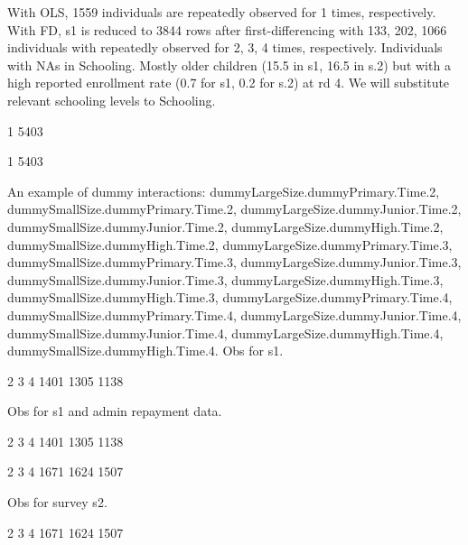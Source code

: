 With OLS,  1559 individuals are repeatedly observed for 1 times, respectively. With FD, \textsf{s1} is reduced to 3844 rows after first-differencing with 133, 202, 1066 individuals with repeatedly observed for 2, 3, 4 times, respectively.
Individuals with NAs in \textsf{Schooling}. Mostly older children (15.5 in \textsf{s1}, 16.5 in \textsf{s.2}) but with a high reported enrollment rate (0.7 for \textsf{s1}, 0.2 for \textsf{s.2}) at rd 4. We will substitute relevant schooling levels to \textsf{Schooling}.
\begin{Schunk}
\begin{Soutput}

   1 
5403 
\end{Soutput}
\begin{Soutput}

   1 
5403 
\end{Soutput}
\end{Schunk}
An example of dummy interactions: \textsf{\footnotesize dummyLargeSize.dummyPrimary.Time.2, dummySmallSize.dummyPrimary.Time.2, dummyLargeSize.dummyJunior.Time.2, dummySmallSize.dummyJunior.Time.2, dummyLargeSize.dummyHigh.Time.2, dummySmallSize.dummyHigh.Time.2, dummyLargeSize.dummyPrimary.Time.3, dummySmallSize.dummyPrimary.Time.3, dummyLargeSize.dummyJunior.Time.3, dummySmallSize.dummyJunior.Time.3, dummyLargeSize.dummyHigh.Time.3, dummySmallSize.dummyHigh.Time.3, dummyLargeSize.dummyPrimary.Time.4, dummySmallSize.dummyPrimary.Time.4, dummyLargeSize.dummyJunior.Time.4, dummySmallSize.dummyJunior.Time.4, dummyLargeSize.dummyHigh.Time.4, dummySmallSize.dummyHigh.Time.4}.
Obs for \textsf{s1}.
\begin{Schunk}
\begin{Soutput}

   2    3    4 
1401 1305 1138 
\end{Soutput}
\end{Schunk}
Obs for \textsf{s1} and admin repayment data.
\begin{Schunk}
\begin{Soutput}

   2    3    4 
1401 1305 1138 
\end{Soutput}
\begin{Soutput}

   2    3    4 
1671 1624 1507 
\end{Soutput}
\end{Schunk}
Obs for survey \textsf{s2}.
\begin{Schunk}
\begin{Soutput}

   2    3    4 
1671 1624 1507 
\end{Soutput}
\end{Schunk}
